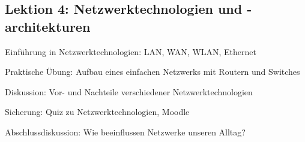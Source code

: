 \subsection{Lektion 4: Netzwerktechnologien und -architekturen}
\begin{todolist}
    \item Einführung in Netzwerktechnologien: LAN, WAN, WLAN, Ethernet
    \item Praktische Übung: Aufbau eines einfachen Netzwerks mit Routern und Switches
    \item Diskussion: Vor- und Nachteile verschiedener Netzwerktechnologien
    \item Sicherung: Quiz zu Netzwerktechnologien, Moodle
    \item Abschlussdiskussion: Wie beeinflussen Netzwerke unseren Alltag?
\end{todolist}
